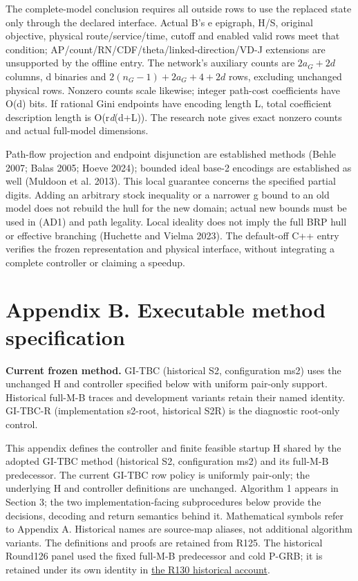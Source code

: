 \documentclass[
  american,
  11pt,
]{article}
\begin{document}
The complete-model conclusion requires all outside rows to use the
replaced state only through the declared interface. Actual B's e
epigraph, H/S, original objective, physical route/service/time, cutoff
and enabled valid rows meet that condition;
AP/count/RN/CDF/theta/linked-direction/VD-J extensions are unsupported
by the offline entry. The network's auxiliary counts are \(2a_G+2d\)
columns, d binaries and \(2(n_G-1)+2a_G+4+2d\) rows, excluding unchanged
physical rows. Nonzero counts scale likewise; integer path-cost
coefficients have O(d) bits. If rational Gini endpoints have encoding
length L, total coefficient description length is O(r\emph{d}(d+L)). The
research note gives exact nonzero counts and actual full-model
dimensions.

Path-flow projection and endpoint disjunction are established methods
(Behle 2007; Balas 2005; Hoeve 2024); bounded ideal base-2 encodings are
established as well (Muldoon et al. 2013). This local guarantee concerns
the specified partial digits. Adding an arbitrary stock inequality or a
narrower g bound to an old model does not rebuild the hull for the new
domain; actual new bounds must be used in (AD1) and path legality. Local
ideality does not imply the full BRP hull or effective branching
(Huchette and Vielma 2023). The default-off C++ entry verifies the
frozen representation and physical interface, without integrating a
complete controller or claiming a speedup.

\clearpage

\section{Appendix B. Executable method
specification}\label{appendix-b.-executable-method-specification}

\textbf{Current frozen method.} GI-TBC (historical S2, configuration
ms2) uses the unchanged H and controller specified below with uniform
pair-only support. Historical full-M-B traces and development variants
retain their named identity. GI-TBC-R (implementation s2-root,
historical S2R) is the diagnostic root-only control.

This appendix defines the controller and finite feasible startup H
shared by the adopted GI-TBC method (historical S2, configuration ms2)
and its full-M-B predecessor. The current GI-TBC row policy is uniformly
pair-only; the underlying H and controller definitions are unchanged.
Algorithm 1 appears in Section 3; the two implementation-facing
subprocedures below provide the decisions, decoding and return semantics
behind it. Mathematical symbols refer to Appendix A. Historical names
are source-map aliases, not additional algorithm variants. The
definitions and proofs are retained from R125. The historical Round126
panel used the fixed full-M-B predecessor and cold P-GRB; it is retained
under its own identity in
\href{https://github.com/yifanXovo/TailoredExact/blob/39043b15b3cceae2cab14a3fbaec39e2b16339ce/results/unified_exact_round130/manuscript.md}{the
R130 historical account}.
\end{document}
